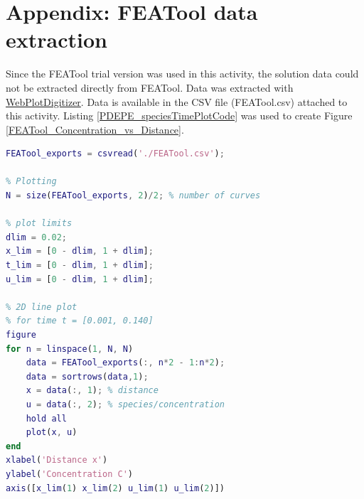 \documentclass{article}
\begin{document}
\section*{Appendix: FEATool data extraction}

Since the FEATool trial version was used in this activity, the solution data could not be extracted directly from FEATool. Data was extracted with \href{https://automeris.io/WebPlotDigitizer/}{WebPlotDigitizer}. Data is available in the CSV file (FEATool.csv) attached to this activity. Listing \ref{PDEPE_speciesTimePlotCode} was used to create Figure \ref{FEATool_Concentration_vs_Distance}.

\begin{lstlisting}[language=Matlab, caption=PDEPE Time vs. Species plot code, label=PDEPE_speciesTimePlotCode]
% Import data
FEATool_exports = csvread('./FEATool.csv');

% Plotting
N = size(FEATool_exports, 2)/2; % number of curves

% plot limits
dlim = 0.02;
x_lim = [0 - dlim, 1 + dlim];
t_lim = [0 - dlim, 1 + dlim];
u_lim = [0 - dlim, 1 + dlim];

% 2D line plot
% for time t = [0.001, 0.140]
figure
for n = linspace(1, N, N)
    data = FEATool_exports(:, n*2 - 1:n*2);
    data = sortrows(data,1);
    x = data(:, 1); % distance
    u = data(:, 2); % species/concentration
    hold all
    plot(x, u)
end
xlabel('Distance x')
ylabel('Concentration C')
axis([x_lim(1) x_lim(2) u_lim(1) u_lim(2)])
\end{lstlisting}
\end{document}
